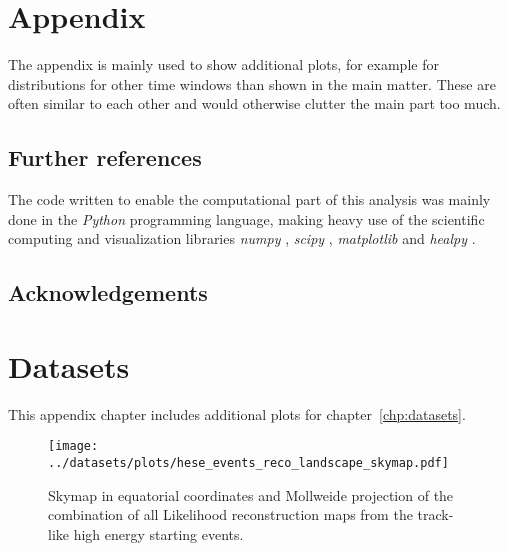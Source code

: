 \chapter{Appendix}
The appendix is mainly used to show additional plots, for example for distributions for other time windows than shown in the main matter.
These are often similar to each other and would otherwise clutter the main part too much.

\section{Further references}
The code written to enable the computational part of this analysis was mainly done in the \emph{Python} programming language, making heavy use of the scientific computing and visualization libraries \emph{numpy} \cite{numpy}, \emph{scipy} \cite{scipy}, \emph{matplotlib} \cite{matplotlib} and \emph{healpy} \cite{Gorski:2004by}.

\section{Acknowledgements}


\chapter{Datasets}
This appendix chapter includes additional plots for chapter~\ref{chp:datasets}.

\begin{figure}[htbp]
  \centering
  \texttt{[image: ../datasets/plots/hese\_events\_reco\_landscape\_skymap.pdf]}
  \caption[Combined Likelihood skymap of the 22 HESEs]{
    Skymap in equatorial coordinates and Mollweide projection of the combination of all Likelihood reconstruction maps from the track-like high energy starting events.
  }
  \label{fig:hese_events_reco_landscape_skymap}
\end{figure}

